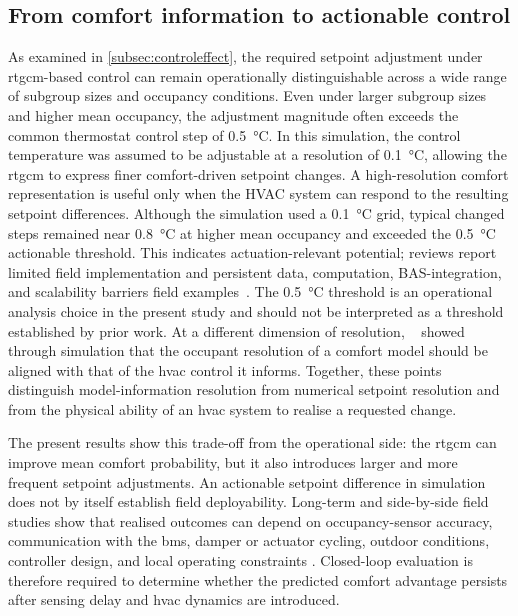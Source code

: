 \subsection{From comfort information to actionable control}
As examined in \autoref{subsec:controleffect}, the required setpoint adjustment under \ac{rtgcm}-based control can remain operationally distinguishable across a wide range of subgroup sizes and occupancy conditions.
Even under larger subgroup sizes and higher mean occupancy, the adjustment magnitude often exceeds the common thermostat control step of \qty{0.5}{\celsius}.
In this simulation, the control temperature was assumed to be adjustable at a resolution of \qty{0.1}{\celsius}, allowing the \ac{rtgcm} to express finer comfort-driven setpoint changes.
A high-resolution comfort representation is useful only when the HVAC system can respond to the resulting setpoint differences.
Although the simulation used a \qty{0.1}{\celsius} grid, typical changed steps remained near \qty{0.8}{\celsius} at higher mean occupancy and exceeded the \qty{0.5}{\celsius} actionable threshold.
This indicates actuation-relevant potential; reviews report limited field implementation and persistent data, computation, BAS-integration, and scalability barriers field examples~\cite{xie_review_2020,soleimanijavid_challenges_2024}.
The \qty{0.5}{\celsius} threshold is an operational analysis choice in the present study and should not be interpreted as a threshold established by prior work.
At a different dimension of resolution, ~\cite{ono_effects_2022} showed through simulation that the occupant resolution of a comfort model should be aligned with that of the \ac{hvac} control it informs.
Together, these points distinguish model-information resolution from numerical setpoint resolution and from the physical ability of an \ac{hvac} system to realise a requested change.

The present results show this trade-off from the operational side: the \ac{rtgcm} can improve mean comfort probability, but it also introduces larger and more frequent setpoint adjustments.
An actionable setpoint difference in simulation does not by itself establish field deployability. 
Long-term and side-by-side field studies show that realised outcomes can depend on occupancy-sensor accuracy, communication with the \ac{bms}, damper or actuator cycling, outdoor conditions, controller design, and local operating constraints \cite{jiang_occupied_2023,kong_hvac_2022,zhang_impact_2023}.
Closed-loop evaluation is therefore required to determine whether the predicted comfort advantage persists after sensing delay and \ac{hvac} dynamics are introduced.

